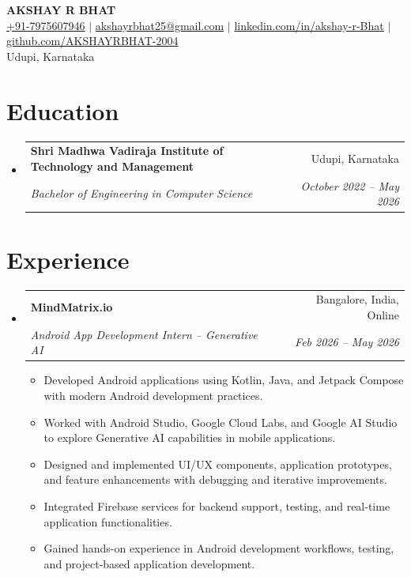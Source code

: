 \documentclass[letterpaper,10.5pt]{article}
\makeatletter
\newcommand{\resumeItem}[1]{
  \item\small{
    {#1 \vspace{-2.5pt}}
  }
}
\newcommand{\resumeSubheading}[4]{
  \vspace{-2pt}\item
    \begin{tabular*}{0.97\textwidth}[t]{l@{\extracolsep{\fill}}r}
      \textbf{#1} & #2 \\
      \textit{\small#3} & \textit{\small #4} \\
    \end{tabular*}\vspace{-7pt}
}
\newcommand{\resumeSubHeadingListStart}{\begin{itemize}[leftmargin=0.15in, label={}]}
\newcommand{\resumeSubHeadingListEnd}{\end{itemize}}
\newcommand{\resumeItemListStart}{\begin{itemize}}
\newcommand{\resumeItemListEnd}{\end{itemize}\vspace{-6pt}}
\makeatother
\begin{document}
\begin{center}
    \textbf{\Huge \scshape AKSHAY R BHAT} \\ \vspace{2pt}
    \small \href{tel:+917975607946}{+91-7975607946} $|$ 
    \href{mailto:akshayrbhat25@gmail.com}{akshayrbhat25@gmail.com} $|$ 
    \href{https://linkedin.com/in/akshay-r-Bhat}{linkedin.com/in/akshay-r-Bhat} $|$ 
    \href{https://github.com/AKSHAYRBHAT-2004}{github.com/AKSHAYRBHAT-2004} \\
    \small Udupi, Karnataka
\end{center}

\section{Education}
  \resumeSubHeadingListStart
    \resumeSubheading
      {Shri Madhwa Vadiraja Institute of Technology and Management}{Udupi, Karnataka}
      {Bachelor of Engineering in Computer Science}{October 2022 -- May 2026}
  \resumeSubHeadingListEnd

\section{Experience}
  \resumeSubHeadingListStart
    \resumeSubheading
      {MindMatrix.io}{Bangalore, India, Online}
      {Android App Development Intern -- Generative AI}{Feb 2026 -- May 2026}
      \resumeItemListStart
        \resumeItem{Developed Android applications using Kotlin, Java, and Jetpack Compose with modern Android development practices.}
        \resumeItem{Worked with Android Studio, Google Cloud Labs, and Google AI Studio to explore Generative AI capabilities in mobile applications.}
        \resumeItem{Designed and implemented UI/UX components, application prototypes, and feature enhancements with debugging and iterative improvements.}
        \resumeItem{Integrated Firebase services for backend support, testing, and real-time application functionalities.}
        \resumeItem{Gained hands-on experience in Android development workflows, testing, and project-based application development.}
      \resumeItemListEnd
  \resumeSubHeadingListEnd

\end{document}
